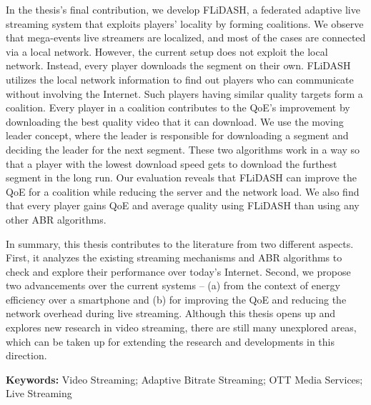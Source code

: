{In the thesis's final contribution, we develop FLiDASH, a federated adaptive live streaming system that exploits players' locality by forming coalitions. We observe that mega-events live streamers are localized, and most of the cases are connected via a local network. However, the current setup does not exploit the local network. Instead, every player downloads the segment on their own. FLiDASH utilizes the local network information to find out players who can communicate without involving the Internet. Such players having similar quality targets form a coalition. Every player in a coalition contributes to the QoE's improvement by downloading the best quality video that it can download. We use the moving leader concept, where the leader is responsible for downloading a segment and deciding the leader for the next segment. These two algorithms work in a way so that a player with the lowest download speed gets to download the furthest segment in the long run. Our evaluation reveals that FLiDASH can improve the QoE for a coalition while reducing the server and the network load. We also find that every player gains QoE and average quality using FLiDASH than using any other ABR algorithms.

In summary, this thesis contributes to the literature from two different aspects. First, it analyzes the existing streaming mechanisms and ABR algorithms to check and explore their performance over today's Internet. Second, we propose two advancements over the current systems -- (a) from the context of energy efficiency over a smartphone and (b) for improving the QoE and reducing the network overhead during live streaming. Although this thesis opens up and explores new research in video streaming, there are still many unexplored areas, which can be taken up for extending the research and developments in this direction. 

\textbf{Keywords:} Video Streaming; Adaptive Bitrate Streaming; OTT Media Services; Live Streaming
}

